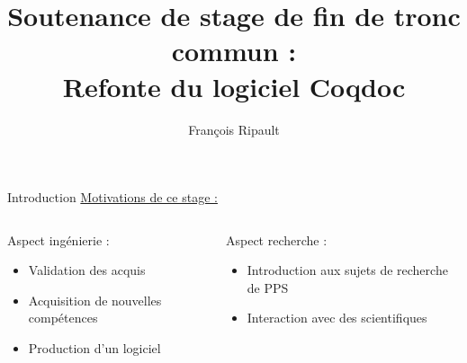 \documentclass[compress]{beamer}
\title{Soutenance de stage de fin de tronc commun : \\ Refonte du logiciel Coqdoc}
\author{François Ripault}
\begin{document}
\begin{frame}
  \titlepage
\end{frame}

\begin{frame}{Introduction}
  \underline{Motivations de ce stage :}

  \vfill

  \begin{columns}[2]
    \begin{column}{0.5\textwidth}
    Aspect ingénierie :
  \begin{itemize}
    \item Validation des acquis
    \item Acquisition de nouvelles compétences
    \item Production d'un logiciel
  \end{itemize}
    \end{column}
    \begin{column}{0.5\textwidth}
      Aspect recherche :
  \begin{itemize}
    \item Introduction aux sujets de recherche
      de PPS
    \item Interaction avec des scientifiques
  \end{itemize}
    \end{column}
  \end{columns}
\end{frame}

\begin{frame}
\tableofcontents
\end{frame}
\end{document}
